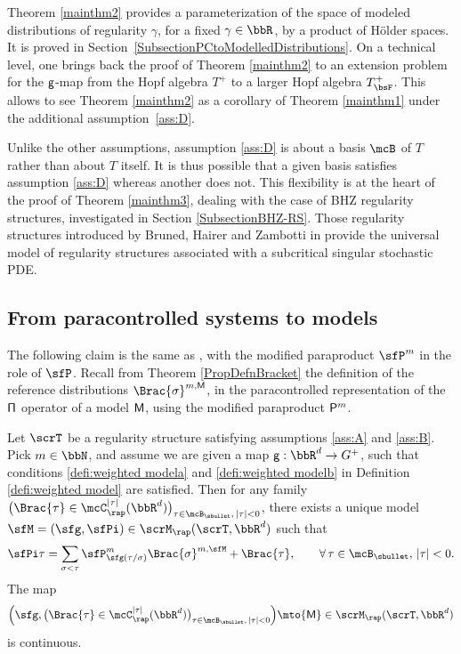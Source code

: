 Theorem \ref{mainthm2} provides a parameterization of the space of modeled distributions of regularity $\gamma$, for a fixed $\gamma\in\bbR$, by a product of Hölder spaces. It is proved in Section~\ref{SubsectionPCtoModelledDistributions}. On a technical level, one brings back the proof of Theorem \ref{mainthm2} to an extension problem for the $\sf g$-map from the Hopf algebra $T^+$ to a larger Hopf algebra $T^+_{\bsF}$. This allows to see Theorem \ref{mainthm2} as a corollary of Theorem \ref{mainthm1} under the additional assumption~\eqref{ass:D}.

Unlike the other assumptions, assumption \eqref{ass:D} is about a basis $\mcB$ of $T$ rather than about $T$ itself. It is thus possible that a given basis satisfies assumption \eqref{ass:D} whereas another does not. This flexibility is at the heart of the proof of Theorem \ref{mainthm3}, dealing with the case of BHZ regularity structures, investigated in Section \ref{SubsectionBHZ-RS}. Those regularity structures introduced by Bruned, Hairer and Zambotti in \cite{BHZ} provide the universal model of regularity structures associated with a subcritical singular stochastic PDE.

\subsection{From paracontrolled systems to models}
\label{SubsectionPCtoModels}

The following claim is the same as \cite[Cor.\,15]{BH}, with the modified paraproduct $\sfP^m$ in the role of $\sfP$. Recall from Theorem \ref{PropDefnBracket} the definition of the reference distributions $\Brac{\sigma}^{m,\sf M}$, in the paracontrolled representation of the $\sf \Pi$ operator of a model $\sf M$, using the modified paraproduct ${\sf P}^m$.

\begin{prop} \label{modifiedCorUniqueExtension}
Let $\scrT$ be a regularity structure satisfying assumptions \eqref{ass:A} and \eqref{ass:B}. Pick $m\in\bbN$, and assume we are given a map ${\sf g}:\bbR^d\to G^+$, such that conditions \eqref{defi:weighted modela} and \eqref{defi:weighted modelb} in Definition \ref{defi:weighted model} are satisfied. Then for any family $\bigl(\Brac{\tau}\in \mcC_\rap^{|\tau|}(\bbR^d)\bigr)_{\tau\in\mcB_\sbullet,\, |\tau|<0}$, there exists a unique model $\sfM=(\sfg,\sfPi)\in\scrM_\rap(\scrT,\bbR^d)$ such that
\begin{align} \label{modifiedCorUniqueExtension:formula}
\sfPi\tau = \sum_{\sigma<\tau} \sfP^m_{\sfg(\tau/\sigma)}\Brac{\sigma}^{m,\sfM} + \Brac{\tau}, \qquad \forall\,\tau\in\mcB_\sbullet, \,\vert\tau\vert<0.
\end{align}
The map
\[
\Bigl(\sfg, \bigl(\Brac{\tau}\in \mcC_\rap^{|\tau|}(\bbR^d)\bigr)_{\tau\in\mcB_\sbullet,\, |\tau|<0}\Bigr) \mto {\sf M} \in \scrM_\rap(\scrT,\bbR^d)
\]
is continuous.
\end{prop}

